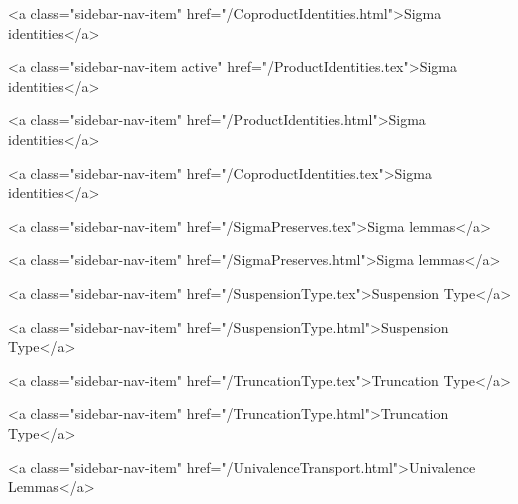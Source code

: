       
    
      
        
          <a class="sidebar-nav-item" href="/CoproductIdentities.html">Sigma identities</a>
        
      
    
      
        
          <a class="sidebar-nav-item active" href="/ProductIdentities.tex">Sigma identities</a>
        
      
    
      
        
          <a class="sidebar-nav-item" href="/ProductIdentities.html">Sigma identities</a>
        
      
    
      
        
          <a class="sidebar-nav-item" href="/CoproductIdentities.tex">Sigma identities</a>
        
      
    
      
        
          <a class="sidebar-nav-item" href="/SigmaPreserves.tex">Sigma lemmas</a>
        
      
    
      
        
          <a class="sidebar-nav-item" href="/SigmaPreserves.html">Sigma lemmas</a>
        
      
    
      
        
          <a class="sidebar-nav-item" href="/SuspensionType.tex">Suspension Type</a>
        
      
    
      
        
          <a class="sidebar-nav-item" href="/SuspensionType.html">Suspension Type</a>
        
      
    
      
        
          <a class="sidebar-nav-item" href="/TruncationType.tex">Truncation Type</a>
        
      
    
      
        
          <a class="sidebar-nav-item" href="/TruncationType.html">Truncation Type</a>
        
      
    
      
        
          <a class="sidebar-nav-item" href="/UnivalenceTransport.html">Univalence Lemmas</a>
        
